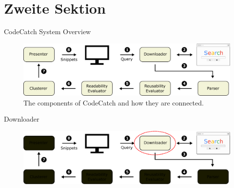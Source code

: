 \documentclass[compress]{beamer}
\begin{document}
\section{Zweite Sektion}
\begin{frame}{CodeCatch System Overview}

\begin{figure}
	\centering
	\includegraphics[width=\textwidth]{systemoverviewnew}
	\caption{The components of CodeCatch and how they are connected.}
\end{figure}

\end{frame}

\begin{frame}{Downloader}

\begin{figure}
	\centering
	\includegraphics[width=\textwidth]{downloader}
\end{figure}

\end{frame}
\end{document}
